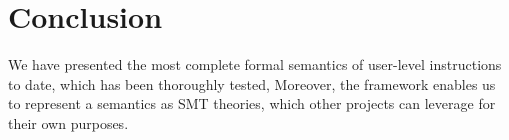 \section{Conclusion}\label{sec:conc}
We have presented the most complete formal semantics of \ISA user-level instructions
to date, which has been thoroughly tested, 
Moreover, the \K framework enables us to represent a semantics as SMT theories,
which other projects can
leverage for their own purposes.




 


   
